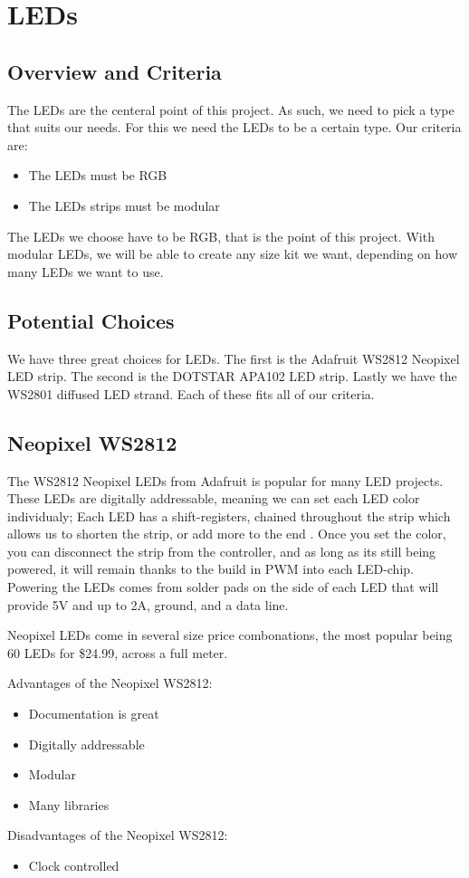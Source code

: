 \documentclass[onecolumn, draftclsnofoot,10pt, compsoc]{IEEEtran}
\begin{document}
	\section{LEDs}
		\subsection{Overview and Criteria}
		\noindent The LEDs are the centeral point of this project. As such, we need
		to pick a type that suits our needs. For this we need the LEDs to be a
		certain type. Our criteria are:
		\begin{itemize}
			\item The LEDs must be RGB
			\item The LEDs strips must be modular
		\end{itemize}
		\noindent The LEDs we choose have to be RGB, that is the point of this
		project. With modular LEDs, we will be able to create any size kit we want,
		depending on how many LEDs we want to use.
		\subsection{Potential Choices}
		\noindent We have three great choices for LEDs. The first is the Adafruit
		WS2812 Neopixel LED strip. The second is the DOTSTAR APA102 LED strip.
		Lastly we have the WS2801 diffused LED strand. Each of these fits all of
		our criteria.
		\subsection{Neopixel WS2812}
		\noindent The WS2812 Neopixel LEDs from Adafruit is popular for many LED
		projects. These LEDs are digitally addressable, meaning we can set each LED
		color individualy; Each LED has a shift-registers, chained throughout the
		strip which allows us to shorten the strip, or add more to the end
		\cite[Pg 2]{neo}. Once you set the color, you can disconnect the strip from
		the controller, and as long as its still being powered, it will remain
		thanks to the build in PWM into each LED-chip. Powering the LEDs comes
		from solder pads on the side of each LED that will provide 5V and up to 2A,
		ground, and a data line.


		\vspace{5mm}
		\noindent Neopixel LEDs come in several size price combonations, the most
		popular being 60 LEDs for \$24.99, across a full meter.

		\vspace{5mm}
		\noindent Advantages of the Neopixel WS2812:
		\begin{itemize}
			\item Documentation is great
			\item Digitally addressable
			\item Modular
			\item Many libraries
		\end{itemize}
		Disadvantages of the Neopixel WS2812:
		\begin{itemize}
			\item Clock controlled
		\end{itemize}
\end{document}
